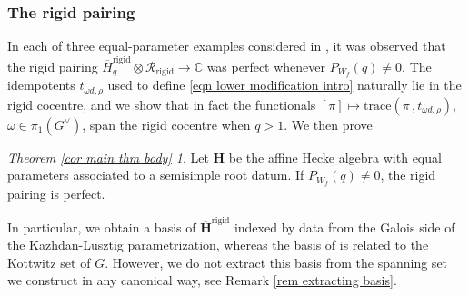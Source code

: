 \documentclass[10pt]{article}
\newcommand{\HH}{\mathbf{H}}
\newcommand{\trace}[2]{\mathrm{trace}\left({#1}\,,{#2}\right)}
\newcommand{\C}{\mathbb{C}}
\theoremstyle{definition}
\theoremstyle{remark}
\newcommand{\Gd}{G^\vee}
\newcommand{\Hr}{\overline{\HH}^{\mathrm{rigid}}}
\newcommand{\Hrq}{\overline{H}^{\mathrm{rigid}}_q}
\newcommand{\RHr}{\mathcal{R}_{\mathrm{rigid}}}
\newcommand{\Zur}{Z_{G^\vee}(u)^{\mathrm{red}}}
\begin{document}
\subsubsection{The rigid pairing}
In each of three equal-parameter examples considered in \cite{CH}, it was observed that the rigid pairing
$\Hrq\otimes\RHr\to\C$ was perfect whenever $P_{W_f}(q)\neq 0$. The idempotents $t_{\omega d,\rho}$ used to define \eqref{eqn lower modification intro} naturally lie in the rigid cocentre, and we show
that in fact the functionals $[\pi]\mapsto\trace{\pi}{t_{\omega d,\rho}}$, $\omega\in\pi_1(\Gd)$, span the 
rigid cocentre when $q>1$. We then prove
%
\theoremstyle{Theorem}
\newtheorem*{thm:rigid}{Theorem \ref{cor main thm body}}
\begin{thm:rigid}
Let $\HH$ be the affine Hecke algebra with equal parameters associated to a semisimple root 
datum. 
If $P_{W_f}(q)\neq 0$, the rigid pairing is perfect.
\end{thm:rigid}
%
In particular, we obtain a basis of $\Hr$ 
indexed by data from the Galois side of the Kazhdan-Lusztig parametrization, whereas the basis
of \cite{CH} is related to the Kottwitz set of $G$. However, we do not extract this basis from the spanning set we construct in any canonical way, see Remark \ref{rem extracting basis}.
%
\end{document}
